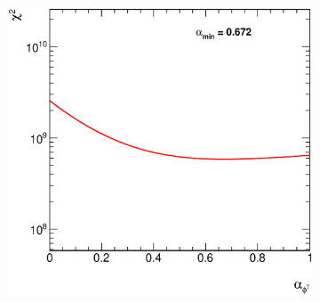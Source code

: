 \documentclass[12pt, twoside]{article}
\numberwithin{equation}{section}
\numberwithin{figure}{section}
\newenvironment{changemargin}[2]{%
\begin{list}{}{%
\setlength{\topsep}{0pt}%
\setlength{\leftmargin}{#1}%
\setlength{\rightmargin}{#2}%
\setlength{\listparindent}{\parindent}%
\setlength{\itemindent}{\parindent}%
\setlength{\parsep}{\parskip}%
}%
\item[]}{\end{list}}
\begin{document}
\begin{figure}[H]
\begin{changemargin}{-0.5cm}{-0.0cm}
\begin{changemargin}{-0.0cm}{-0.5cm}
\begin{subfigure}[b]{0.33\textwidth}
            \subcaption{}
            \label{fig:ChiSquareEtaPhoton}
        \end{subfigure}
        \begin{subfigure}[b]{0.33\textwidth}
            \includegraphics[width=\textwidth]{./images/ChiSquareTest/CHI2-103.eps}
            \subcaption{}
            \label{fig:ChiSquarePhiPhoton}
        \end{subfigure}


\end{changemargin}
\end{changemargin}
\end{figure}
\end{document}
